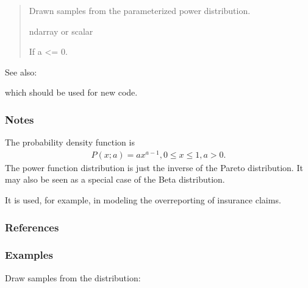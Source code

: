\documentclass[letterpaper,10pt,english]{sphinxmanual}
\begin{document}
\begin{fulllineitems}
\begin{quote}
\begin{description}
\begin{itemize}
\end{itemize}

\sphinxAtStartPar
{} \textendash{} Drawn samples from the parameterized power distribution.

\sphinxAtStartPar
ndarray or scalar

\sphinxAtStartPar
{} \textendash{} If a \textless{}= 0.

\end{description}\end{quote}


\begin{sphinxseealso}{See also:}
\begin{description}
\sphinxAtStartPar
which should be used for new code.

\end{description}


\end{sphinxseealso}

\subsubsection*{Notes}

\sphinxAtStartPar
The probability density function is
\begin{equation*}
\begin{split}P(x; a) = ax^{a-1}, 0 \le x \le 1, a>0.\end{split}
\end{equation*}
\sphinxAtStartPar
The power function distribution is just the inverse of the Pareto
distribution. It may also be seen as a special case of the Beta
distribution.

\sphinxAtStartPar
It is used, for example, in modeling the over\sphinxhyphen{}reporting of insurance
claims.
\subsubsection*{References}
\subsubsection*{Examples}

\sphinxAtStartPar
Draw samples from the distribution:

\begin{sphinxVerbatim}[commandchars=\\\{\}]
   
  
   
\end{sphinxVerbatim}


\end{fulllineitems}
\end{document}
